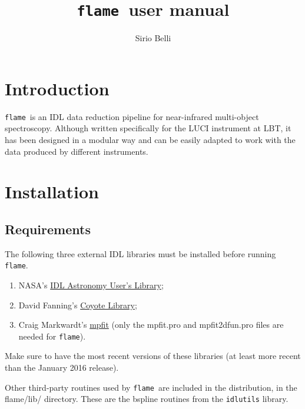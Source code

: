 \documentclass[a4paper, notitlepage]{article}
\newcommand{\flame}{\texttt{flame}}
\begin{document}
\title{\flame\ user manual}
\author{Sirio Belli}
\maketitle





\section{Introduction}

\flame\ is an IDL data reduction pipeline for near-infrared multi-object spectroscopy. Although written specifically for the LUCI instrument at LBT, it has been designed in a modular way and can be easily adapted to work with the data produced by different instruments.





\section{Installation}

\subsection{Requirements}

The following three external IDL libraries must be installed before running \flame.
\begin{enumerate}
\item NASA's \href{http://idlastro.gsfc.nasa.gov/}{IDL Astronomy User's Library};
\item David Fanning's \href{http://www.idlcoyote.com/code_tips/installcoyote.php}{Coyote Library};
\item Craig Markwardt's \href{https://www.physics.wisc.edu/~craigm/idl/fitting.html}{mpfit} (only the mpfit.pro and mpfit2dfun.pro files are needed for \flame). 
\end{enumerate}
Make sure to have the most recent versions of these libraries (at least more recent than the January 2016 release).

Other third-party routines used by \flame\ are included in the distribution, in the flame/lib/ directory. These are the bspline routines from the \texttt{idlutils} library.
\end{document}
